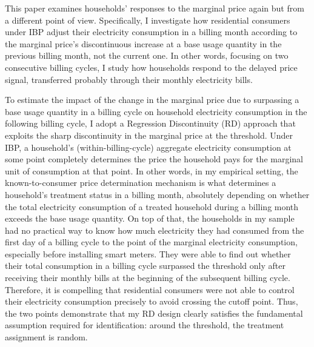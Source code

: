 This paper examines households' responses to the marginal price again but from a different point of view. Specifically, I investigate how residential consumers under IBP adjust their electricity consumption in a billing month according to the marginal price's discontinuous increase at a base usage quantity in the previous billing month, not the current one. In other words, focusing on two consecutive billing cycles, I study how households respond to the delayed price signal, transferred probably through their monthly electricity bills. 

To estimate the impact of the change in the marginal price due to surpassing a base usage quantity in a billing cycle on household electricity consumption in the following billing cycle, I adopt a Regression Discontinuity (RD) approach that exploits the sharp discontinuity in the marginal price at the threshold. Under IBP, a household's (within-billing-cycle) aggregate electricity consumption at some point completely determines the price the household pays for the marginal unit of consumption at that point. In other words, in my empirical setting, the known-to-consumer price determination mechanism is what determines a household's treatment status in a billing month, absolutely depending on whether the total electricity consumption of a treated household during a billing month exceeds the base usage quantity. On top of that, the households in my sample had no practical way to know how much electricity they had consumed from the first day of a billing cycle to the point of the marginal electricity consumption, especially before installing smart meters. They were able to find out whether their total consumption in a billing cycle surpassed the threshold only after receiving their monthly bills at the beginning of the subsequent billing cycle. Therefore, it is compelling that residential consumers were not able to control their electricity consumption precisely to avoid crossing the cutoff point. Thus, the two points demonstrate that my RD design clearly satisfies the fundamental assumption required for identification: around the threshold, the treatment assignment is random.

